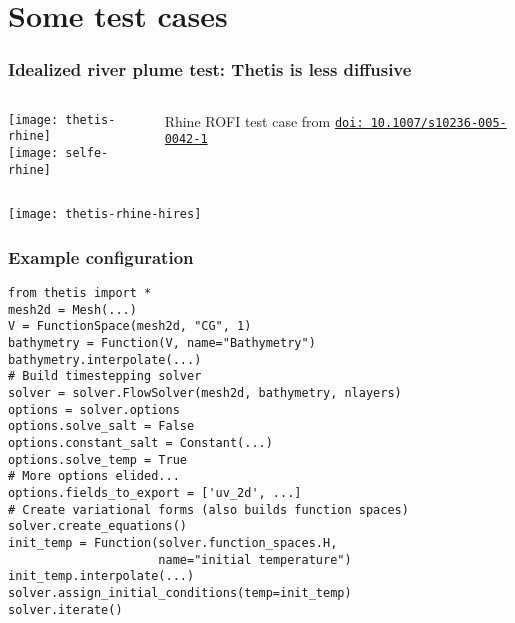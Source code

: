 \documentclass{beamer}
\newcommand{\doilink}[1]{%
  \href{http://dx.doi.org/#1}%
  {{\small\texttt{doi:\,#1}{}}}%
}
\begin{document}
\section{Some test cases}

\begin{frame}
  \frametitle{Idealized river plume test: Thetis is less diffusive}
  \begin{columns}
    \begin{column}{0.75\textwidth}
        \texttt{[image: thetis-rhine]}\\
        \texttt{[image: selfe-rhine]}
    \end{column}
    \hspace{-2em}
    \begin{column}{0.4\textwidth}
      Rhine ROFI test case from \cite{Boer:2006} \doilink{10.1007/s10236-005-0042-1}
    \end{column}
  \end{columns}
\end{frame}

\bgroup
{}
\begin{frame}[standout]
  \hspace*{-2em}\texttt{[image: thetis-rhine-hires]}
\end{frame}
\egroup

\begin{frame}[fragile]
  \frametitle{Example configuration}
\begin{verbatim}
from thetis import *
mesh2d = Mesh(...)
V = FunctionSpace(mesh2d, "CG", 1)
bathymetry = Function(V, name="Bathymetry")
bathymetry.interpolate(...)
# Build timestepping solver
solver = solver.FlowSolver(mesh2d, bathymetry, nlayers)
options = solver.options
options.solve_salt = False
options.constant_salt = Constant(...)
options.solve_temp = True
# More options elided...
options.fields_to_export = ['uv_2d', ...]
# Create variational forms (also builds function spaces)
solver.create_equations()
init_temp = Function(solver.function_spaces.H, 
                     name="initial temperature")
init_temp.interpolate(...)
solver.assign_initial_conditions(temp=init_temp)
solver.iterate()
\end{verbatim}
\end{frame}
\end{document}
